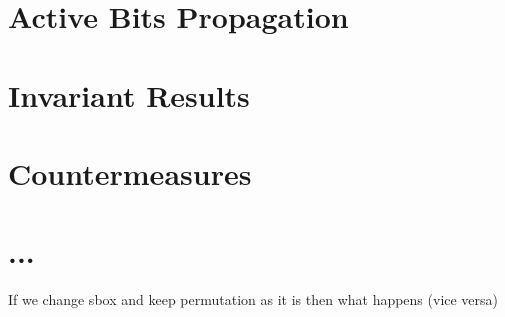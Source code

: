 \section{Active Bits Propagation}

\subsection{\present[]}

\subsection{\gift[64]}

\subsection{\gift[128]}


\section{Invariant Results}

\section{Countermeasures}

\section{...}
If we change sbox and keep permutation as it is then what happens (vice versa)